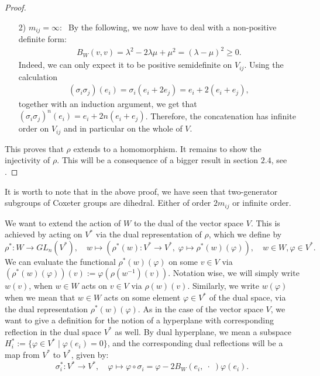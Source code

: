 \begin{proof}
\begin{itemize}
        \item[2)] \(m_{ij} = \infty:\;\) By the following, we now have to deal with a non-positive definite form:
              \begin{align*}
                  B_W(v,v) = \lambda^2 - 2\lambda\mu + \mu^2 = (\lambda - \mu)^2 \geq 0.
              \end{align*}
              Indeed, we can only expect it to be positive semidefinite on \(V_{ij}\).
              Using the calculation
              \begin{align*}
                  (\sigma_i\sigma_j)(e_i) = \sigma_i (e_i + 2e_j) = e_i + 2(e_i + e_j),
              \end{align*}
              together with an induction argument, we get that \((\sigma_i\sigma_j)^n(e_i) = e_i + 2n(e_i + e_j)\).
              Therefore, the concatenation has infinite order on \(V_{ij}\) and in particular on the whole of \(V\).
    \end{itemize}
    This proves that \(\rho\) extends to a homomorphism.
    It remains to show the injectivity of \(\rho\).
    This will be a consequence of a bigger result in section \(2.4\), see .
\end{proof}

\begin{remark}
    It is worth to note that in the above proof, we have seen that two-generator subgroups of Coxeter groups are dihedral.
    Either of order \(2m_{ij}\) or infinite order.
\end{remark}

We want to extend the action of \(W\) to the dual of the vector space \(V\).
This is achieved by acting on \(V^*\) via the dual representation of \(\rho\), which we define by
\[\rho^* : W \to GL_n(V^*),\quad w \mapsto (\rho^*(w): V^* \to V^*, \; \varphi \mapsto \rho^*(w)(\varphi)), \quad w\in W, \varphi\in V^*.\]
We can evaluate the functional \(\rho^*(w)(\varphi)\) on some \(v \in V\) via \((\rho^*(w)(\varphi))(v) := \varphi(\rho(w^{-1})(v))\).
Notation wise, we will simply write \(w(v)\), when \(w \in W\) acts on \(v \in V\) via \(\rho(w)(v)\).
Similarly, we write \(w(\varphi)\) when we mean that \(w \in W\) acts on some element \(\varphi \in V^*\) of the dual space, via the dual representation \(\rho^*(w)(\varphi)\).
As in the case of the vector space \(V\), we want to give a definition for the notion of a hyperplane with corresponding reflection in the dual space \(V^*\) as well.
By dual hyperplane, we mean a subspace \(H_i^* := \{\varphi \in V^* \;\vert\; \varphi (e_i) = 0\}\), and the corresponding dual reflections will be a map from \(V^*\) to \(V^*\), given by:
\[\sigma_i^* : V^* \to V^*,\quad \varphi \mapsto \varphi \circ \sigma_i = \varphi - 2B_W(e_i,\;\cdot\;)\varphi(e_i).\]

